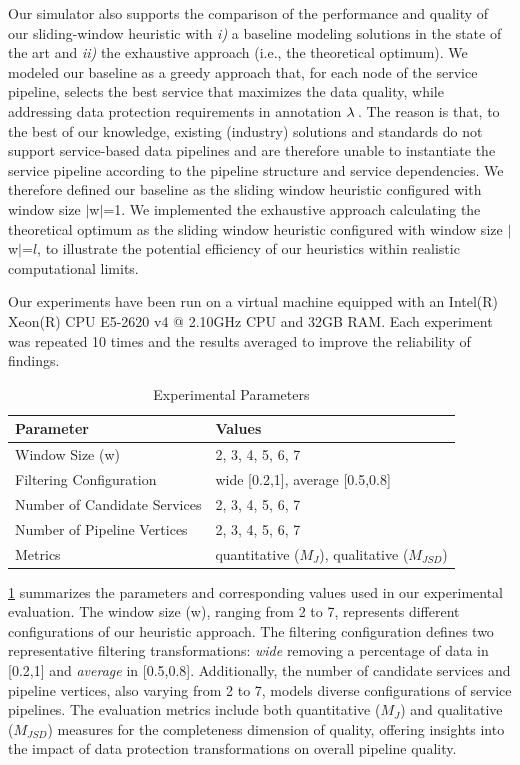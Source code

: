     Our simulator also supports the comparison of the performance and quality of our sliding-window heuristic with \emph{i)} a baseline modeling solutions in the state of the art and \emph{ii)} the exhaustive approach (i.e., the theoretical optimum). We modeled our baseline as a greedy approach that, for each node of the service pipeline, selects the best service that maximizes the data quality, while addressing data protection requirements in annotation $\lambda\,$. The reason is that, to the best of our knowledge, existing (industry) solutions and standards do not support service-based data pipelines and are therefore unable to instantiate the service pipeline according to the pipeline structure and service dependencies. We therefore defined our baseline as the sliding window heuristic configured with window size $|$w$|$=1.
    We implemented the exhaustive approach calculating the theoretical optimum as the sliding window heuristic configured with window size $|$w$|$=$l$, to illustrate the potential efficiency of our heuristics within realistic computational limits.



    Our experiments have been run on a virtual machine equipped with an Intel(R) Xeon(R) CPU E5-2620 v4 @ 2.10GHz CPU and 32GB RAM. Each experiment was repeated 10 times and the results averaged to improve the reliability of findings.



    \begin{table}[!t]
      \caption{Experimental Parameters}
      \label{tab:parameters}
      \centering
      {\color{OurColor2}
        \begin{tabular}{l|l}
          \textbf{Parameter}                  & \textbf{Values}  \\
          \hline
          Window Size (\textbar{}w\textbar{}) & 2, 3, 4, 5, 6, 7 \\
          Filtering Configuration                & wide [0.2,1], average [0.5,0.8]\\
          Number of Candidate Services        & 2, 3, 4, 5, 6, 7 \\
          Number of Pipeline Vertices            & 2, 3, 4, 5, 6, 7 \\
          Metrics                             & quantitative ($M_J$), qualitative ($M_{JSD}$) \\
        \end{tabular}
      }
    \end{table}
  {\color{OurColor2}
  \cref{tab:parameters} summarizes the parameters and corresponding values used in our experimental evaluation. The window size (\textbar{}w\textbar{}), ranging from 2 to 7, represents different configurations of our heuristic approach. The filtering configuration defines two representative filtering transformations: \textit{wide} removing a percentage of data in [0.2,1] and \textit{average} in [0.5,0.8]. Additionally, the number of candidate services and pipeline vertices, also varying from 2 to 7, models diverse configurations of service pipelines. The evaluation metrics include both quantitative ($M_J$) and qualitative ($M_{JSD}$) measures for the completeness dimension of quality, offering insights into the impact of data protection transformations on overall pipeline quality.
  }

